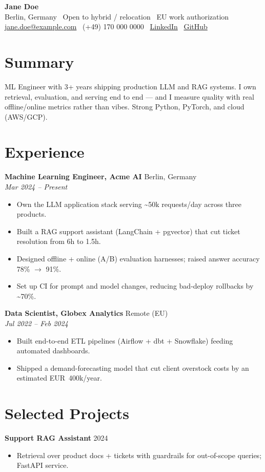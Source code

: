 \documentclass[10pt,a4paper]{article}
\begin{document}
{\LARGE \textbf{\color{emphasis}Jane Doe}}\\
Berlin, Germany \textbar\ Open to hybrid / relocation \textbar\ EU work authorization\\
\href{mailto:jane.doe@example.com}{jane.doe@example.com} \textbar\ (+49) 170 000 0000 \textbar\
\href{https://www.linkedin.com/in/jane-doe-example/}{LinkedIn} \textbar\
\href{https://github.com/janedoe}{GitHub}

\section*{Summary}
ML Engineer with 3+ years shipping production LLM and RAG systems. I own retrieval,
evaluation, and serving end to end — and I measure quality with real offline/online
metrics rather than vibes. Strong Python, PyTorch, and cloud (AWS/GCP).

\section*{Experience}
\textbf{Machine Learning Engineer, Acme AI} \hfill Berlin, Germany\\
\textit{Mar 2024 -- Present}
\begin{itemize}
  \item Own the LLM application stack serving \textasciitilde50k requests/day across three products.
  \item Built a RAG support assistant (LangChain + pgvector) that cut ticket resolution from 6h to 1.5h.
  \item Designed offline + online (A/B) evaluation harnesses; raised answer accuracy 78\% $\rightarrow$ 91\%.
  \item Set up CI for prompt and model changes, reducing bad-deploy rollbacks by \textasciitilde70\%.
\end{itemize}

\textbf{Data Scientist, Globex Analytics} \hfill Remote (EU)\\
\textit{Jul 2022 -- Feb 2024}
\begin{itemize}
  \item Built end-to-end ETL pipelines (Airflow + dbt + Snowflake) feeding automated dashboards.
  \item Shipped a demand-forecasting model that cut client overstock costs by an estimated EUR~400k/year.
\end{itemize}

\section*{Selected Projects}
\textbf{Support RAG Assistant} \hfill 2024
\begin{itemize}
  \item Retrieval over product docs + tickets with guardrails for out-of-scope queries; FastAPI service.
\end{itemize}
\end{document}
